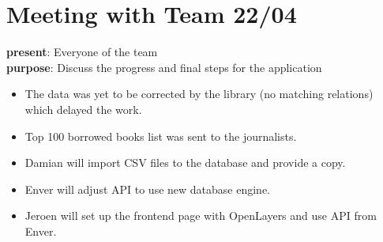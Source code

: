 \section{Meeting with Team 22/04}
{\bf present}: Everyone of the team\\
{\bf purpose}: Discuss the progress and final steps for the application\\
\begin{itemize}
	\item The data was yet to be corrected by the library (no matching relations) which delayed the work.
	\item Top 100 borrowed books list was sent to the journalists.
	\item Damian will import CSV files to the database and provide a copy.
	\item Enver will adjust API to use new database engine.
	\item Jeroen will set up the frontend page with OpenLayers and use API from Enver.
\end{itemize}